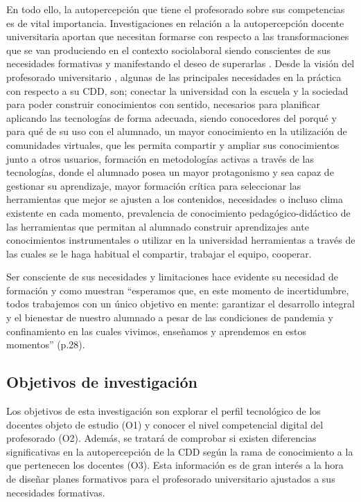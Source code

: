 \documentclass[spanish]{textolivre}
\begin{document}
En todo ello, la autopercepción que tiene el profesorado sobre sus competencias es de vital importancia.  Investigaciones en relación a la autopercepción docente universitaria aportan que necesitan formarse con respecto a las transformaciones que se van produciendo en el contexto sociolaboral siendo conscientes de sus necesidades formativas y manifestando el deseo de superarlas \cite{mas-torello2016}. Desde la visión del profesorado universitario \cite{domingo-coscollola2019}, algunas de las principales necesidades en la práctica con respecto a su CDD, son; conectar la universidad con la escuela y la sociedad para poder construir conocimientos con sentido, necesarios para planificar aplicando las tecnologías de forma adecuada, siendo conocedores del porqué y para qué de su uso con el alumnado, un mayor conocimiento en la utilización de comunidades virtuales, que les permita compartir y ampliar sus conocimientos junto a otros usuarios, formación en metodologías activas a través de las tecnologías, donde el alumnado posea un mayor protagonismo y sea capaz de gestionar su aprendizaje, mayor formación crítica para seleccionar las herramientas que mejor se ajusten a los contenidos, necesidades o incluso clima existente en cada momento, prevalencia de conocimiento pedagógico-didáctico de las herramientas que permitan al alumnado construir aprendizajes ante conocimientos instrumentales o utilizar en la universidad herramientas a través de las cuales se le haga habitual el compartir, trabajar el equipo, cooperar.

Ser consciente de sus necesidades y limitaciones hace evidente su necesidad de formación y como muestran \textcite{trujillo2020} “esperamos que, en este momento de incertidumbre, todos trabajemos con un único objetivo en mente: garantizar el desarrollo integral y el bienestar de nuestro alumnado a pesar de las condiciones de pandemia y confinamiento en las cuales vivimos, enseñamos y aprendemos en estos momentos” (p.28).

\subsection{Objetivos de investigación}
Los objetivos de esta investigación son explorar el perfil tecnológico de los docentes objeto de estudio (O1) y conocer el nivel competencial digital del profesorado (O2). Además, se tratará de comprobar si existen diferencias significativas en la autopercepción de la CDD según la rama de conocimiento a la que pertenecen los docentes (O3). Esta información es de gran interés a la hora de diseñar planes formativos para el profesorado universitario ajustados a sus necesidades formativas.
\end{document}
